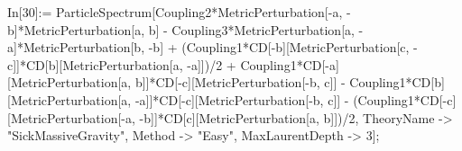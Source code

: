 In[30]:= ParticleSpectrum[Coupling2*MetricPerturbation[-a, -b]*MetricPerturbation[a, b] - Coupling3*MetricPerturbation[a, -a]*MetricPerturbation[b, -b] + (Coupling1*CD[-b][MetricPerturbation[c, -c]]*CD[b][MetricPerturbation[a, -a]])/2 + Coupling1*CD[-a][MetricPerturbation[a, b]]*CD[-c][MetricPerturbation[-b, c]] - Coupling1*CD[b][MetricPerturbation[a, -a]]*CD[-c][MetricPerturbation[-b, c]] - (Coupling1*CD[-c][MetricPerturbation[-a, -b]]*CD[c][MetricPerturbation[a, b]])/2, TheoryName -> "SickMassiveGravity", Method -> "Easy", MaxLaurentDepth -> 3]; 